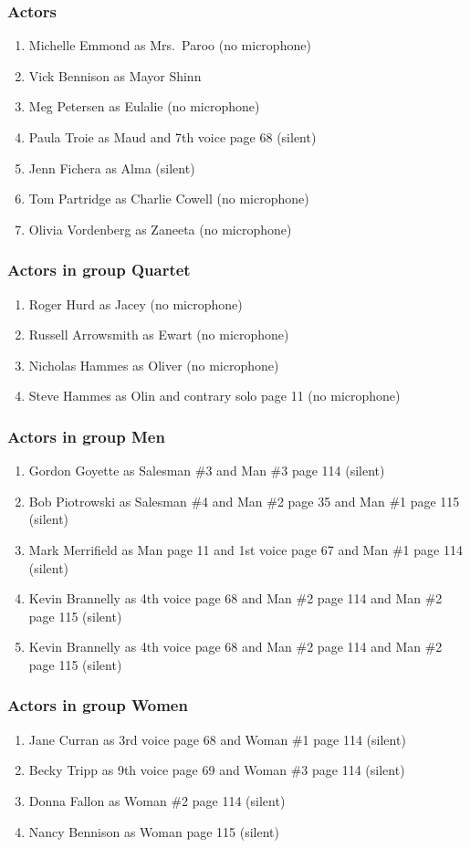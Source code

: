 \subsubsection{Actors}
\begin{enumerate}
\item Michelle Emmond as Mrs.~Paroo (no microphone)
\item Vick Bennison as Mayor Shinn
\item Meg Petersen as Eulalie (no microphone)
\item Paula Troie as Maud and 7th voice page 68 (silent)
\item Jenn Fichera as Alma (silent)
\item Tom Partridge as Charlie Cowell (no microphone)
\item Olivia Vordenberg as Zaneeta (no microphone)
\end{enumerate}
\subsubsection{Actors in group Quartet}
\begin{enumerate}
\item Roger Hurd as Jacey (no microphone)
\item Russell Arrowsmith as Ewart (no microphone)
\item Nicholas Hammes as Oliver (no microphone)
\item Steve Hammes as Olin and contrary solo page 11 (no microphone)
\end{enumerate}
\subsubsection{Actors in group Men}
\begin{enumerate}
\item Gordon Goyette as Salesman \#3 and Man \#3 page 114 (silent)
\item Bob Piotrowski as Salesman \#4 and Man \#2 page 35 and Man \#1 page 115 (silent)
\item Mark Merrifield as Man page 11 and 1st voice page 67 and Man \#1 page 114 (silent)
\item Kevin Brannelly as 4th voice page 68 and Man \#2 page 114 and Man \#2 page 115 (silent)
\item Kevin Brannelly as 4th voice page 68 and Man \#2 page 114 and Man \#2 page 115 (silent)
\end{enumerate}
\subsubsection{Actors in group Women}
\begin{enumerate}
\item Jane Curran as 3rd voice page 68 and Woman \#1 page 114 (silent)
\item Becky Tripp as 9th voice page 69 and Woman \#3 page 114 (silent)
\item Donna Fallon as Woman \#2 page 114 (silent)
\item Nancy Bennison as Woman page 115 (silent)
\end{enumerate}

